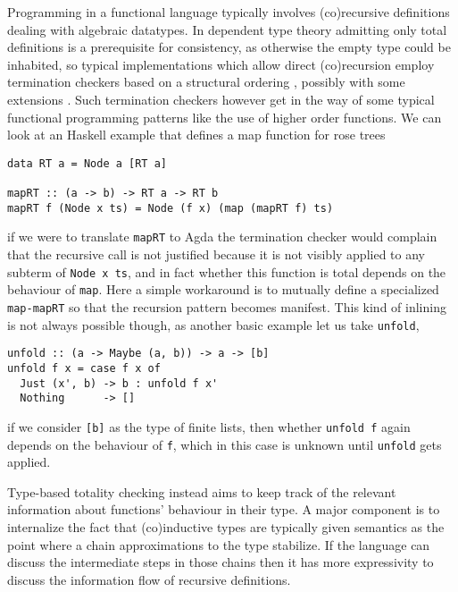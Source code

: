 \documentclass{book}
\begin{document}
Programming in a functional language typically
involves (co)recursive definitions dealing with algebraic datatypes.
In dependent type theory admitting only total definitions is a
prerequisite for consistency, as otherwise the empty type could be
inhabited, so typical implementations which allow direct (co)recursion
employ termination checkers based on a structural
ordering \cite{gimenez:guardeddefinitions}, possibly with some extensions
\cite{abelAltenkirch:jfp02,jones:sizeChange,wahlstedt:PhD}.
Such termination checkers however get in the way of some typical
functional programming patterns like the use of higher order functions.
We can look at an Haskell example that defines a map function
for rose trees
\begin{verbatim}
data RT a = Node a [RT a]

mapRT :: (a -> b) -> RT a -> RT b
mapRT f (Node x ts) = Node (f x) (map (mapRT f) ts)
\end{verbatim}
if we were to translate \verb|mapRT| to Agda the termination checker
would complain that the recursive call is not justified because it is
not visibly applied to any subterm of \verb|Node x ts|, and in fact
whether this function is total depends on the behaviour of \verb|map|.
Here a simple workaround is to mutually define a specialized
\verb|map-mapRT| so that the recursion pattern becomes manifest.
This kind of inlining is not always possible though, as another basic
example let us take \verb|unfold|,
\begin{verbatim}
unfold :: (a -> Maybe (a, b)) -> a -> [b]
unfold f x = case f x of
  Just (x', b) -> b : unfold f x'
  Nothing      -> []
\end{verbatim}
if we consider \verb|[b]| as the type of finite lists, then whether
\verb|unfold f| again depends on the behaviour of \verb|f|, which in
this case is unknown until \verb|unfold| gets applied.

Type-based totality checking instead aims to keep track of the
relevant information about functions' behaviour in their type. A
major component is to internalize the fact that (co)inductive types
are typically given semantics as the point where a chain
approximations to the type stabilize.
If the language can discuss the intermediate steps in those chains
then it has more expressivity to discuss the information flow of
recursive definitions.
\end{document}

